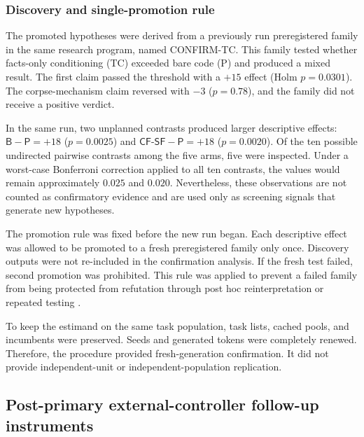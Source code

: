 \documentclass{article}
\numberwithin{equation}{section}  %
\theoremstyle{definition}
\newcommand{\armP}{\textsf{P}}
\newcommand{\armB}{\textsf{B}}
\newcommand{\armTC}{\textsf{TC}}
\newcommand{\armCF}{\textsf{CF-SF}}
\begin{document}
\subsubsection{Discovery and single-promotion rule}
\label{sec:discovery}

The promoted hypotheses were derived from a previously run preregistered family in the same
research program, named CONFIRM-TC. This family tested whether facts-only conditioning
(\armTC) exceeded bare code (\armP) and produced a mixed result. The first claim passed the
threshold with a $+15$ effect (Holm $p=0.0301$). The corpse-mechanism claim reversed with
$-3$ ($p=0.78$), and the family did not receive a positive verdict.

In the same run, two unplanned contrasts produced larger descriptive effects:
$\armB-\armP=+18$ ($p=0.0025$) and $\armCF-\armP=+18$ ($p=0.0020$). Of the ten possible
undirected pairwise contrasts among the five arms, five were inspected. Under a worst-case
Bonferroni correction applied to all ten contrasts, the values would remain approximately
$0.025$ and $0.020$. Nevertheless, these observations are not counted as confirmatory
evidence and are used only as screening signals that generate new hypotheses.

The promotion rule was fixed before the new run began. Each descriptive effect was allowed to
be promoted to a fresh preregistered family only once. Discovery outputs were not re-included
in the confirmation analysis. If the fresh test failed, second promotion was prohibited. This
rule was applied to prevent a failed family from being protected from refutation through post
hoc reinterpretation or repeated testing
\citep{popper1959logic,popper1963conjectures,mayospanos2006severe,hofman2023prereg}.

To keep the estimand on the same task population, task lists, cached pools, and incumbents were
preserved. Seeds and generated tokens were completely renewed. Therefore, the procedure provided
fresh-generation confirmation. It did not provide independent-unit or independent-population
replication.

\subsection{Post-primary external-controller follow-up instruments}
\label{sec:controller-methods}
\end{document}
